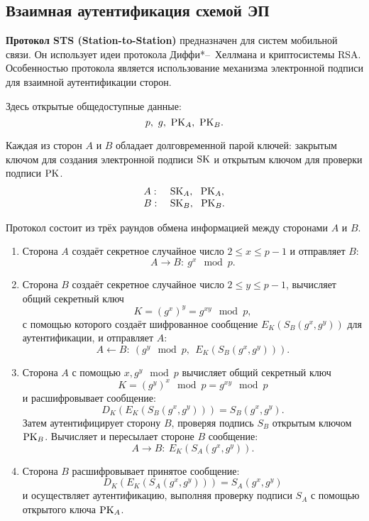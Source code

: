 \subsection{Взаимная аутентификация схемой ЭП}

\textbf{Протокол STS (Station-to-Station)} предназначен для систем мобильной связи. Он использует идеи протокола Диффи*--~Хеллмана и криптосистемы RSA. Особенностью протокола является использование механизма электронной подписи для взаимной аутентификации сторон.

Здесь открытые общедоступные данные:
    \[ p, ~ g, ~ \textrm{PK}_A, ~ \textrm{PK}_B. \]

Каждая из сторон $A$ и $B$ обладает долговременной парой ключей: закрытым ключом для создания электронной подписи $\textrm{SK}$ и открытым ключом для проверки подписи $\textrm{PK}$.
\[ \begin{array}{ll}
    A: & ~ \textrm{SK}_A, ~~ \textrm{PK}_A, \\
    B: & ~ \textrm{SK}_B, ~~ \textrm{PK}_B. \\
\end{array} \]

Протокол состоит из трёх раундов обмена информацией между сторонами $A$ и $B$.
\begin{enumerate}
    \item Сторона $A$ создаёт секретное случайное число $2 \leq x \leq p-1$ и отправляет $B$:
            \[ A \rightarrow B: ~ g^x \mod p. \]
    \item Сторона $B$ создаёт секретное случайное число $2 \leq y \leq p-1$, вычисляет общий секретный ключ
            \[ K = (g^x)^y = g^{xy} \mod p, \]
        с помощью которого создаёт шифрованное сообщение $E_K(S_B(g^x, g^y))$ для аутентификации, и отправляет $A$:
            \[ A \leftarrow B: ~ \left( g^y \mod p, ~~ E_K( S_B( g^x, g^y)) \right). \]
    \item Сторона $A$ с помощью $x, g^y \mod p$ вычисляет общий секретный ключ
            \[ K = (g^y)^x \mod p = g^{xy} \mod p \]
        и расшифровывает сообщение:
            \[ D_K( E_K( S_B( g^x, g^y))) = S_B( g^x, g^y). \]
            Затем аутентифицирует сторону $B$, проверяя подпись $S_B$ открытым ключом $\textrm{PK}_B$. Вычисляет и пересылает стороне $B$ сообщение:
            \[ A \rightarrow B: ~ E_K( S_A( g^x, g^y)). \]
    \item Сторона $B$ расшифровывает принятое сообщение:
            \[ D_K( E_K( S_A( g^x, g^y))) = S_A( g^x, g^y) \]
        и осуществляет аутентификацию, выполняя проверку подписи $S_A$ с помощью открытого ключа $\textrm{PK}_A$.
\end{enumerate}
